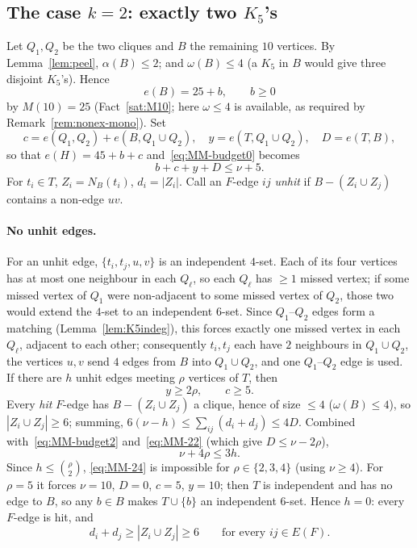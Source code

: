 \documentclass[11pt,reqno]{amsart}
\theoremstyle{definition}
\theoremstyle{remark}
\newcommand{\abs}[1]{\left|#1\right|}
\begin{document}
\subsection{The case $k=2$: exactly two $K_5$'s}\label{ssec:MM-two}
Let $Q_1,Q_2$ be the two cliques and $B$ the remaining $10$ vertices. By
Lemma~\ref{lem:peel}, $\alpha(B)\le 2$; and $\omega(B)\le 4$ (a $K_5$ in $B$ would
give three disjoint $K_5$'s). Hence
\begin{equation}\label{eq:MM-eB}
  e(B)=25+b,\qquad b\ge 0
\end{equation}
by $M(10)=25$ (Fact~\ref{sat:M10}; here $\omega\le 4$ is available, as required by
Remark~\ref{rem:nonex-mono}). Set
\[
  c=e(Q_1,Q_2)+e(B,Q_1\cup Q_2),\quad y=e(T,Q_1\cup Q_2),\quad D=e(T,B),
\]
so that $e(H)=45+b+c$ and~\eqref{eq:MM-budget0} becomes
\begin{equation}\label{eq:MM-budget2}
  b+c+y+D\le \nu+5 .
\end{equation}
For $t_i\in T$, $Z_i=N_B(t_i)$, $d_i=\abs{Z_i}$. Call an $F$-edge $ij$ \emph{unhit}
if $B-(Z_i\cup Z_j)$ contains a non-edge $uv$.

\paragraph{No unhit edges.}
For an unhit edge, $\{t_i,t_j,u,v\}$ is an independent $4$-set. Each of its four
vertices has at most one neighbour in each $Q_\ell$, so each $Q_\ell$ has $\ge 1$
missed vertex; if some missed vertex of $Q_1$ were non-adjacent to some missed
vertex of $Q_2$, those two would extend the $4$-set to an independent $6$-set.
Since $Q_1$--$Q_2$ edges form a matching (Lemma~\ref{lem:K5indeg}), this forces
exactly one missed vertex in each $Q_\ell$, adjacent to each other; consequently
$t_i,t_j$ each have $2$ neighbours in $Q_1\cup Q_2$, the vertices $u,v$ send $4$
edges from $B$ into $Q_1\cup Q_2$, and one $Q_1$--$Q_2$ edge is used. If there are
$h$ unhit edges meeting $\rho$ vertices of $T$, then
\begin{equation}\label{eq:MM-22}
  y\ge 2\rho,\qquad c\ge 5 .
\end{equation}
Every \emph{hit} $F$-edge has $B-(Z_i\cup Z_j)$ a clique, hence of size $\le 4$
($\omega(B)\le 4$), so $\abs{Z_i\cup Z_j}\ge 6$; summing,
$6(\nu-h)\le\sum_{ij}(d_i+d_j)\le 4D$. Combined with~\eqref{eq:MM-budget2}
and~\eqref{eq:MM-22} (which give $D\le\nu-2\rho$),
\begin{equation}\label{eq:MM-24}
  \nu+4\rho\le 3h .
\end{equation}
Since $h\le\binom\rho2$, \eqref{eq:MM-24} is impossible for $\rho\in\{2,3,4\}$
(using $\nu\ge 4$). For $\rho=5$ it forces $\nu=10$, $D=0$, $c=5$, $y=10$; then $T$
is independent and has no edge to $B$, so any $b\in B$ makes $T\cup\{b\}$ an
independent $6$-set. Hence $h=0$: every $F$-edge is hit, and
\begin{equation}\label{eq:MM-25}
  d_i+d_j\ge \abs{Z_i\cup Z_j}\ge 6\qquad\text{for every }ij\in E(F).
\end{equation}
\end{document}
